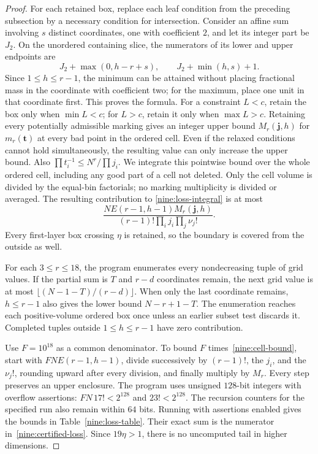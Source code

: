 \documentclass[11pt,a4paper]{article}
\theoremstyle{paperplain}
\numberwithin{equation}{section}
\begin{document}
\begin{proof}
For each retained box, replace each leaf condition from the preceding
subsection by a necessary condition for intersection.
Consider an affine sum involving $s$ distinct coordinates, one with
coefficient $2$, and let its integer part be $J_2$.
On the unordered containing slice, the numerators of its lower and upper
endpoints are
\begin{equation}\label{nine:double-range}
 J_2+\max(0,h-r+s),\qquad J_2+\min(h,s)+1.
\end{equation}
Since $1\le h\le r-1$, the minimum can be attained without placing fractional
mass in the coordinate with coefficient two; for the maximum, place one unit
in that coordinate first. This proves the formula.
For a constraint $L<c$, retain the box only when $\min L<c$;
for $L>c$, retain it only when $\max L>c$.
Retaining every potentially admissible marking gives an integer upper bound
$M_r(\mathbf j,h)$ for $m_r(\mathbf t)$ at every bad point in the ordered cell.
Even if the relaxed conditions cannot hold simultaneously, the resulting
value can only increase the upper bound.
Also $\prod t_i^{-1}\le N^r/\prod j_i$. We integrate this pointwise bound
over the whole ordered cell, including any good part of a cell not deleted.
Only the cell volume is divided by the equal-bin factorials; no marking
multiplicity is divided or averaged. The resulting contribution to
\eqref{nine:loss-integral} is at most
\begin{equation}\label{nine:cell-bound}
 \frac{N E(r-1,h-1)M_r(\mathbf j,h)}
 {(r-1)!\prod_i j_i\prod_j\nu_j!}.
\end{equation}
Every first-layer box crossing $\eta$ is retained, so the boundary is covered
from the outside as well.

For each $3\leqslant r\leqslant18$, the program
 enumerates every nondecreasing tuple
of grid values.
If the partial sum is $T$ and $r-d$ coordinates remain, the next grid
value is at most $\lfloor(N-1-T)/(r-d)\rfloor$.
When only the last coordinate remains, $h\le r-1$ also gives the lower bound
$N-r+1-T$.
The enumeration reaches each positive-volume ordered box once unless
an earlier subset test discards it. Completed tuples outside
$1\le h\le r-1$ have zero contribution.

Use $F=10^{18}$ as a common denominator.
To bound $F$ times~\eqref{nine:cell-bound}, start with $FN E(r-1,h-1)$,
divide successively by $(r-1)!$, the $j_i$, and the $\nu_j!$, rounding upward
after every division, and finally multiply by $M_r$.
Every step preserves an upper enclosure.
The program uses unsigned $128$-bit integers with overflow assertions:
$FN\,17!<2^{128}$ and $23!<2^{128}$.
The recursion counters for the specified run also remain within $64$ bits.
Running with assertions enabled gives the bounds in Table~\ref{nine:loss-table}.
Their exact sum is the numerator in~\eqref{nine:certified-loss}.
Since $19\eta>1$, there is no uncomputed tail in higher dimensions.
\end{proof}
\end{document}
